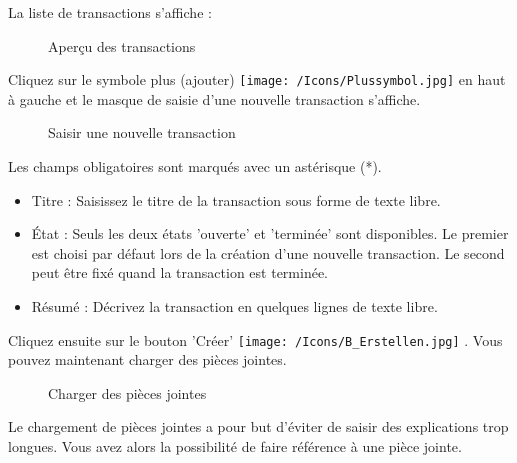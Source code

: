 La liste de transactions s'affiche :

\begin{figure}[H]
\caption{Aperçu des transactions}
\end{figure}

Cliquez sur le symbole plus (ajouter) \texttt{[image: /Icons/Plussymbol.jpg]}  en haut à gauche et le masque de saisie d'une nouvelle transaction s'affiche.

\begin{figure}[H]
\caption{Saisir une nouvelle transaction}
\end{figure}

Les champs obligatoires sont marqués avec un astérisque (*).

\begin{itemize}
\item
Titre  : Saisissez le titre de la transaction sous forme de texte libre.
\item 
État  : Seuls les deux états 'ouverte' et 'terminée' sont disponibles. Le premier est choisi par défaut lors de la création d'une nouvelle transaction. Le second peut être fixé quand la transaction est terminée.
\item
Résumé  : Décrivez la transaction en quelques lignes de texte libre.
\end{itemize}

Cliquez ensuite sur le bouton 'Créer' \texttt{[image: /Icons/B\_Erstellen.jpg]} . Vous pouvez maintenant charger des pièces jointes.

\begin{figure}[H]
\caption{Charger des pièces jointes}
\end{figure}

Le chargement de pièces jointes a pour but d'éviter de saisir des explications trop longues. Vous avez alors la possibilité de faire référence à une pièce jointe.

